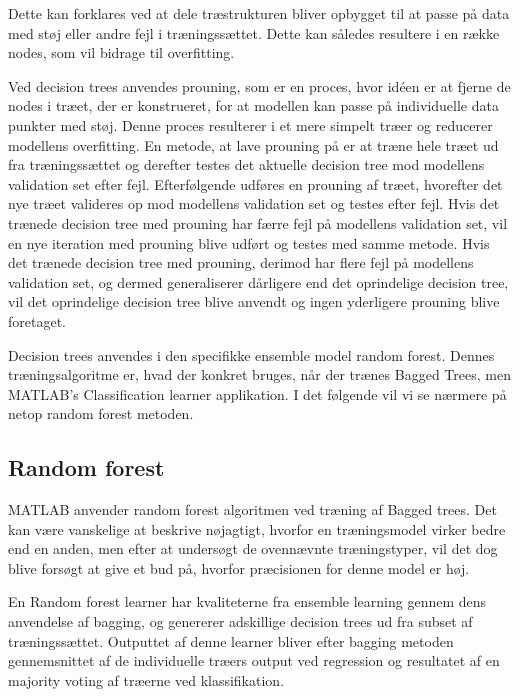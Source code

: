 Dette kan forklares ved at dele træstrukturen bliver opbygget til at passe på data med støj eller andre fejl i træningssættet. Dette kan således resultere i en række nodes, som vil bidrage til overfitting.

Ved decision trees anvendes prouning, som er en proces, hvor idéen er at fjerne de nodes i træet, der er konstrueret, for at modellen kan passe på individuelle data punkter med støj. Denne proces resulterer i et mere simpelt træer og reducerer modellens overfitting. 
En metode, at lave prouning på er at træne hele træet ud fra træningssættet og derefter testes det aktuelle decision tree mod modellens validation set efter fejl. Efterfølgende udføres en prouning af træet, hvorefter det nye træet valideres op mod modellens validation set og testes efter fejl. Hvis det trænede decision tree med prouning har færre fejl på modellens validation set, vil en nye iteration med prouning blive udført og testes med samme metode. Hvis det trænede decision tree med prouning, derimod har flere fejl på modellens validation set, og dermed generaliserer dårligere end det oprindelige decision tree, vil det oprindelige decision tree blive anvendt og ingen yderligere prouning blive foretaget. 

Decision trees anvendes i den specifikke ensemble model random forest. Dennes træningsalgoritme er, hvad der konkret bruges, når der trænes Bagged Trees, men MATLAB’s Classification learner applikation. I det følgende vil vi se nærmere på netop random forest metoden.

\subsection{Random forest}
MATLAB anvender random forest algoritmen ved træning af Bagged trees. Det kan være vanskelige at beskrive nøjagtigt, hvorfor en træningsmodel virker bedre end en anden, men efter at undersøgt de ovennævnte træningstyper, vil det dog blive forsøgt at give et bud på, hvorfor præcisionen for denne model er høj.

En Random forest learner har kvaliteterne fra ensemble learning gennem dens anvendelse af bagging, og genererer adskillige decision trees ud fra subset af træningssættet. Outputtet af denne learner bliver efter bagging metoden gennemsnittet af de individuelle træers output ved regression og resultatet af en majority voting af træerne ved klassifikation. 


